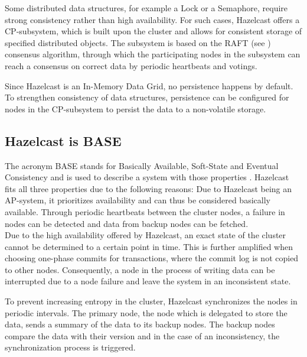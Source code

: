 Some distributed data structures, for example a Lock or a Semaphore, require
strong consistency rather than high availability. For such cases, Hazelcast
offers a CP-subsystem, which is built upon the cluster and allows for consistent
storage of specified distributed objects. The subsystem is based on the RAFT
(see \textcite{WoosRaft})
consensus algorithm, through which the participating nodes in the subsystem can
reach a consensus on correct data by periodic heartbeats and
votings. \parencite{HZcap, HZcpsub, WoosRaft}

Since Hazelcast is an In-Memory Data Grid, no persistence happens by default. To
strengthen consistency of data structures, persistence can be configured for
nodes in the CP-subsystem to persist the data to a non-volatile
storage. \parencite{HZcpsub}

\subsection{Hazelcast is BASE}
The acronym BASE stands for Basically Available, Soft-State and Eventual
Consistency and is used to describe a system with those properties
\parencite{Brewer2000}. Hazelcast fits all three properties due to the
following reasons: Due to Hazelcast being an AP-system, it prioritizes
availability and can thus be considered basically available. Through periodic
heartbeats between the cluster nodes, a failure in nodes can be detected and
data from backup nodes can be fetched. \parencite{HZfailure}\\
Due to the high availability offered by Hazelcast, an exact state of the cluster
cannot be determined to a certain point in time. This is further amplified when
choosing one-phase commits for transactions, where the commit log is not copied
to other nodes. Consequently, a node in the process of writing data can be
interrupted due to a node failure and leave the system in an inconsistent state.
\parencite{HZtransactions}

To prevent increasing entropy in the cluster, Hazelcast synchronizes the nodes
in periodic intervals. The primary node, the node which is delegated to store
the data, sends a summary of the data to its backup nodes. The backup nodes
compare the data with their version and in the case of an inconsistency, the
synchronization process is triggered. \parencite{HZreplic}
